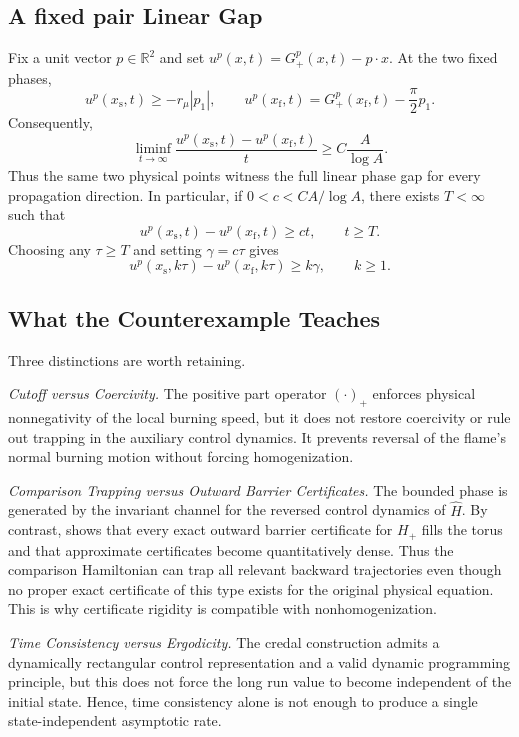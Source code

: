 \documentclass[11pt,reqno,noamsfonts]{amsart}
\theoremstyle{definition}
\theoremstyle{remark}
\newcommand{\Hcut}{H_{+}}
\newcommand{\Hhat}{\widehat H}
\begin{document}
\subsection{A fixed pair Linear Gap}

Fix a unit vector $p\in\mathbb R^2$ and set
$u^p(x,t)=G_+^p(x,t)-p\cdot x$.  At the two fixed phases,
\[
  u^p(x_{\mathrm s},t)\ge-r_\mu|p_1|,
  \qquad
  u^p(x_{\mathrm f},t)
  =G_+^p(x_{\mathrm f},t)-\frac\pi2p_1.
\]
Consequently,
\begin{equation*}
  \liminf_{t\to\infty}
  \frac{u^p(x_{\mathrm s},t)-u^p(x_{\mathrm f},t)}t
  \ge C\frac A{\log A}.
\end{equation*}
Thus the same two physical points witness the full linear phase gap for
every propagation direction.  In particular, if
$0<c<CA/\log A$, there exists $T<\infty$ such that
\[
  u^p(x_{\mathrm s},t)-u^p(x_{\mathrm f},t)\ge ct,
  \qquad t\ge T.
\]
Choosing any $\tau\ge T$ and setting $\gamma=c\tau$ gives
\begin{equation*}
  u^p(x_{\mathrm s},k\tau)-u^p(x_{\mathrm f},k\tau)
  \ge k\gamma,
  \qquad k\ge1.
\end{equation*}



\subsection{What the Counterexample Teaches}
Three distinctions are worth retaining.

\textit{Cutoff versus Coercivity.}
The positive part operator $(\cdot)_+$ enforces physical nonnegativity of the local burning
speed, but it does not restore coercivity or rule out trapping in the
auxiliary control dynamics. It prevents reversal of the flame's 
normal burning motion without forcing homogenization.

\textit{Comparison Trapping versus Outward Barrier Certificates.}
The bounded phase is generated by the invariant channel for the
reversed control dynamics of $\Hhat$.  By contrast,
 shows that every exact outward barrier certificate
for $\Hcut$ fills the torus and that approximate certificates become
quantitatively dense.  Thus the comparison Hamiltonian can trap all
relevant backward trajectories even though no proper exact certificate
of this type exists for the original physical equation.  This is why
certificate rigidity is compatible with nonhomogenization.

\textit{Time Consistency versus Ergodicity.}
The credal construction admits a dynamically rectangular control
representation and a valid dynamic programming principle, but this does
not force the long run value to become independent of the initial
state. Hence, time consistency alone is 
not enough to produce a single state-independent asymptotic rate.
\end{document}
